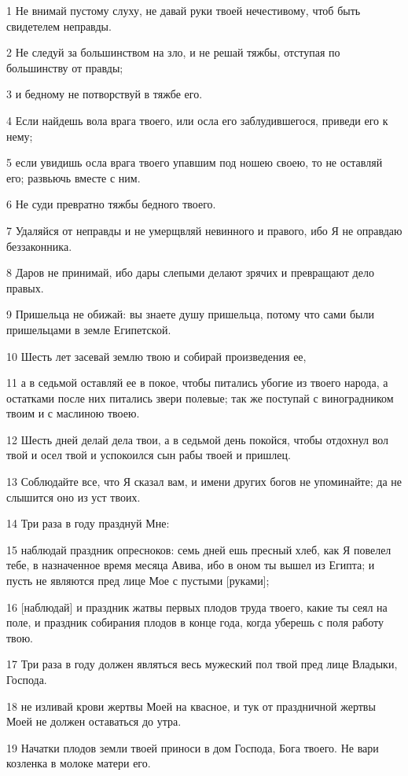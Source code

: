 \par 1 Не внимай пустому слуху, не давай руки твоей нечестивому, чтоб быть свидетелем неправды.
\par 2 Не следуй за большинством на зло, и не решай тяжбы, отступая по большинству от правды;
\par 3 и бедному не потворствуй в тяжбе его.
\par 4 Если найдешь вола врага твоего, или осла его заблудившегося, приведи его к нему;
\par 5 если увидишь осла врага твоего упавшим под ношею своею, то не оставляй его; развьючь вместе с ним.
\par 6 Не суди превратно тяжбы бедного твоего.
\par 7 Удаляйся от неправды и не умерщвляй невинного и правого, ибо Я не оправдаю беззаконника.
\par 8 Даров не принимай, ибо дары слепыми делают зрячих и превращают дело правых.
\par 9 Пришельца не обижай: вы знаете душу пришельца, потому что сами были пришельцами в земле Египетской.
\par 10 Шесть лет засевай землю твою и собирай произведения ее,
\par 11 а в седьмой оставляй ее в покое, чтобы питались убогие из твоего народа, а остатками после них питались звери полевые; так же поступай с виноградником твоим и с маслиною твоею.
\par 12 Шесть дней делай дела твои, а в седьмой день покойся, чтобы отдохнул вол твой и осел твой и успокоился сын рабы твоей и пришлец.
\par 13 Соблюдайте все, что Я сказал вам, и имени других богов не упоминайте; да не слышится оно из уст твоих.
\par 14 Три раза в году празднуй Мне:
\par 15 наблюдай праздник опресноков: семь дней ешь пресный хлеб, как Я повелел тебе, в назначенное время месяца Авива, ибо в оном ты вышел из Египта; и пусть не являются пред лице Мое с пустыми [руками];
\par 16 [наблюдай] и праздник жатвы первых плодов труда твоего, какие ты сеял на поле, и праздник собирания плодов в конце года, когда уберешь с поля работу твою.
\par 17 Три раза в году должен являться весь мужеский пол твой пред лице Владыки, Господа.
\par 18 не изливай крови жертвы Моей на квасное, и тук от праздничной жертвы Моей не должен оставаться до утра.
\par 19 Начатки плодов земли твоей приноси в дом Господа, Бога твоего. Не вари козленка в молоке матери его.
